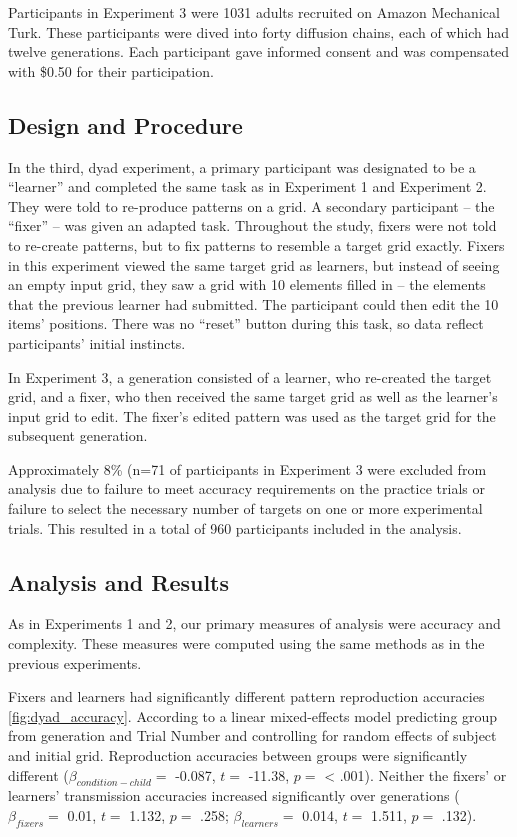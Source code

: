 \documentclass[10pt, letterpaper]{article}
\begin{document}
Participants in Experiment 3 were 1031 adults recruited on Amazon
Mechanical Turk. These participants were dived into forty diffusion
chains, each of which had twelve generations. Each participant gave
informed consent and was compensated with \$0.50 for their
participation.

\subsection{Design and Procedure}\label{design-and-procedure-2}

In the third, dyad experiment, a primary participant was designated to
be a ``learner'' and completed the same task as in Experiment 1 and
Experiment 2. They were told to re-produce patterns on a grid. A
secondary participant -- the ``fixer'' -- was given an adapted task.
Throughout the study, fixers were not told to re-create patterns, but to
fix patterns to resemble a target grid exactly. Fixers in this
experiment viewed the same target grid as learners, but instead of
seeing an empty input grid, they saw a grid with 10 elements filled in
-- the elements that the previous learner had submitted. The participant
could then edit the 10 items' positions. There was no ``reset'' button
during this task, so data reflect participants' initial instincts.

In Experiment 3, a generation consisted of a learner, who re-created the
target grid, and a fixer, who then received the same target grid as well
as the learner's input grid to edit. The fixer's edited pattern was used
as the target grid for the subsequent generation.

Approximately 8\% (n=71 of participants in Experiment 3 were excluded
from analysis due to failure to meet accuracy requirements on the
practice trials or failure to select the necessary number of targets on
one or more experimental trials. This resulted in a total of 960
participants included in the analysis.

\subsection{Analysis and Results}\label{analysis-and-results}

As in Experiments 1 and 2, our primary measures of analysis were
accuracy and complexity. These measures were computed using the same
methods as in the previous experiments.

Fixers and learners had significantly different pattern reproduction
accuracies \ref{fig:dyad_accuracy}. According to a linear mixed-effects
model predicting group from generation and Trial Number and controlling
for random effects of subject and initial grid. Reproduction accuracies
between groups were significantly different
(\(\beta_{condition-child} =\) -0.087, \(t =\) -11.38, \(p =\)
\textless{} .001). Neither the fixers' or learners' transmission
accuracies increased significantly over generations
(\(\beta_{fixers} =\) 0.01, \(t =\) 1.132, \(p =\) .258;
\(\beta_{learners} =\) 0.014, \(t =\) 1.511, \(p =\) .132).
\end{document}
